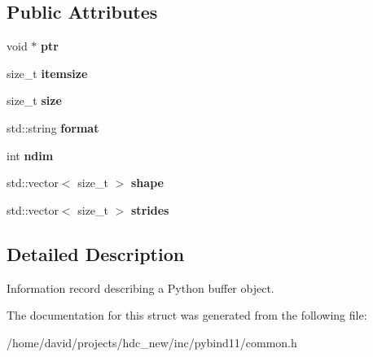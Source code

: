 \subsection*{Public Attributes}
\begin{DoxyCompactItemize}
\item 
void $\ast$ {\bfseries ptr}\hypertarget{structbuffer__info_a2976ad4b157156ebbcffe667888e2d28}{}\label{structbuffer__info_a2976ad4b157156ebbcffe667888e2d28}

\item 
size\+\_\+t {\bfseries itemsize}\hypertarget{structbuffer__info_a7494f66c9c95a82dd6eff9dda08a977e}{}\label{structbuffer__info_a7494f66c9c95a82dd6eff9dda08a977e}

\item 
size\+\_\+t {\bfseries size}\hypertarget{structbuffer__info_aaf74b6421f011d82147968a2f268afbe}{}\label{structbuffer__info_aaf74b6421f011d82147968a2f268afbe}

\item 
std\+::string {\bfseries format}\hypertarget{structbuffer__info_af5d89b84be8905b695a23b914e92bbda}{}\label{structbuffer__info_af5d89b84be8905b695a23b914e92bbda}

\item 
int {\bfseries ndim}\hypertarget{structbuffer__info_abe6277f0455e6dfeffbdebe3e021809b}{}\label{structbuffer__info_abe6277f0455e6dfeffbdebe3e021809b}

\item 
std\+::vector$<$ size\+\_\+t $>$ {\bfseries shape}\hypertarget{structbuffer__info_a52f57c8b5648c4ec0acb5d9c43e02b92}{}\label{structbuffer__info_a52f57c8b5648c4ec0acb5d9c43e02b92}

\item 
std\+::vector$<$ size\+\_\+t $>$ {\bfseries strides}\hypertarget{structbuffer__info_a4da66b26d9a8f90cbe3a464584648782}{}\label{structbuffer__info_a4da66b26d9a8f90cbe3a464584648782}

\end{DoxyCompactItemize}


\subsection{Detailed Description}
Information record describing a Python buffer object. 

The documentation for this struct was generated from the following file\+:\begin{DoxyCompactItemize}
\item 
/home/david/projects/hdc\+\_\+new/inc/pybind11/common.\+h\end{DoxyCompactItemize}
